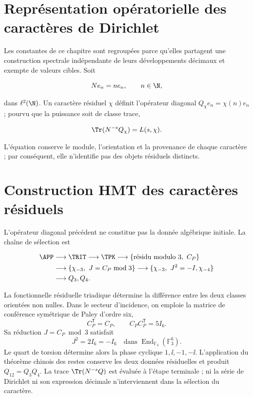 \label{ch:spectral}

\section{Représentation opératorielle des caractères de Dirichlet}

Les constantes de ce chapitre sont regroupées parce qu'elles partagent une construction
spectrale indépendante de leurs développements décimaux et exempte de valeurs
cibles. Soit

\[
Ne_n=ne_n,\qquad n\in\N,
\]

dans \(\ell^2(\N)\). Un caractère résiduel \(\chi\) définit l'opérateur diagonal \(Q_\chi e_n=\chi(n)e_n\) ; pourvu que la puissance soit de classe trace,

\begin{equation}
\Tr(N^{-s}Q_\chi)=L(s,\chi).
\label{eq:L-trace}
\end{equation}

L'équation conserve le module, l'orientation et la provenance de chaque
caractère ; par conséquent, elle n'identifie pas des objets résiduels distincts.

\section{Construction HMT des caractères résiduels}

L'opérateur diagonal précédent ne constitue pas la donnée algébrique initiale. La
chaîne de sélection est

\[
\begin{aligned}
\APP&\longrightarrow\TRIT\longrightarrow\TPK
\longrightarrow\{\text{résidu modulo }3,\ C_P\}\\
&\longrightarrow\{\chi_{-3},\ J=C_P\bmod3\}
\longrightarrow\{\chi_{-3},\ J^2=-I,\chi_{-4}\}\\
&\longrightarrow Q_3,Q_4.
\end{aligned}
\]

La fonctionnelle résiduelle triadique détermine la différence entre les deux classes
orientées non nulles. Dans le secteur d'incidence, on emploie la matrice de conférence
symétrique de Paley d'ordre six,
\[
C_P^{\mathsf T}=C_P,\qquad C_PC_P^{\mathsf T}=5I_6.
\]
Sa réduction \(J=C_P\bmod3\) satisfait
\[
J^2=2I_6=-I_6
\quad\text{dans }\operatorname{End}_{\mathbb F_3}(\mathbb F_3^6).
\]
Le quart de torsion détermine alors la phase cyclique
\(1,\ii,-1,-\ii\). L'application du théorème chinois des restes conserve
les deux données résiduelles et produit \(Q_{12}=Q_3Q_4\). La trace
\(\Tr(N^{-s}Q)\) est évaluée à l'étape terminale ; ni la série de Dirichlet
ni son expression décimale n'interviennent dans la sélection du caractère.

